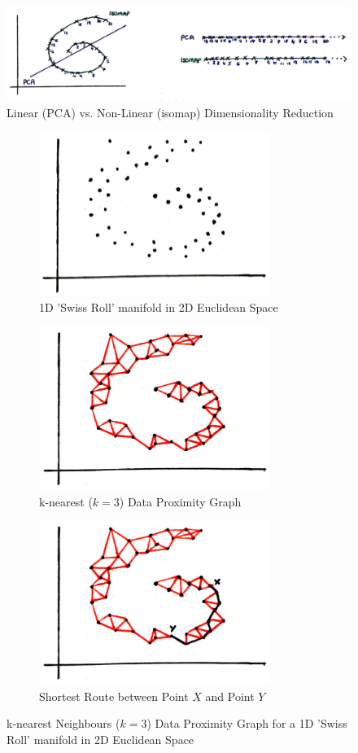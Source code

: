 \documentclass{article}
\begin{document}
\begin{figure}[ht!]
	\centering
	\includegraphics[width=150mm]{isomap}
	\caption{Linear (PCA) vs. Non-Linear (isomap) Dimensionality Reduction}
	\label{fig:isomap}
\end{figure}

\begin{figure}[!ht]
	\begin{subfigure}{.5\textwidth}
	\centering
	\includegraphics[width=75mm]{dpg-manifold}
	\caption{1D 'Swiss Roll' manifold in 2D Euclidean Space}
	\label{fig:manifold}
	\end{subfigure}
	\begin{subfigure}{.5\textwidth}
	\centering
	\includegraphics[width=75mm]{data-proximity-graph}
	\caption{k-nearest ($k = 3$) Data Proximity Graph}
	\label{fig:k-nearest-neighbours}
	\end{subfigure}
	\begin{subfigure}{.5\textwidth}
	\centering
	\includegraphics[width=75mm]{shortest-route}
	\caption{Shortest Route between Point $X$ and Point $Y$}
	\label{fig:route}
	\end{subfigure}
	\caption{k-nearest Neighbours ($k=3$) Data Proximity Graph for a 1D 'Swiss Roll' manifold in 2D Euclidean Space}
	\label{fig:data-proximity}
\end{figure}{}
 
\end{document}
